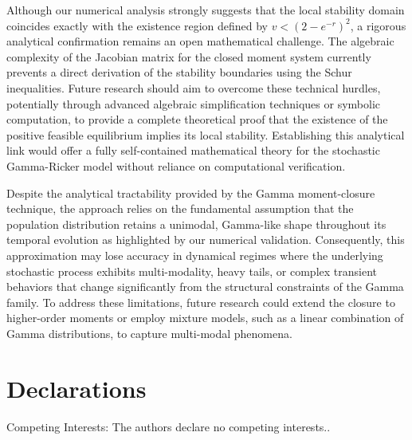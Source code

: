 \documentclass[12pt]{article}
\theoremstyle{definition}
\begin{document}
Although our numerical analysis strongly suggests that the local stability domain coincides exactly with the existence region defined by $v < (2-e^{-r})^2$, a rigorous analytical confirmation remains an open mathematical challenge. The algebraic complexity of the Jacobian matrix for the closed moment system currently prevents a direct derivation of the stability boundaries using the Schur inequalities. Future research should aim to overcome these technical hurdles, potentially through advanced algebraic simplification techniques or symbolic computation, to provide a complete theoretical proof that the existence of the positive feasible equilibrium implies its local stability. Establishing this analytical link would offer a fully self-contained mathematical theory for the stochastic Gamma-Ricker model without reliance on computational verification.


Despite the analytical tractability provided by the Gamma moment-closure technique, the approach relies on the fundamental assumption that the population distribution retains a unimodal, Gamma-like shape throughout its temporal evolution as highlighted by our numerical validation.  Consequently, this approximation may lose accuracy in dynamical regimes where the underlying stochastic process exhibits multi-modality, heavy tails, or complex transient behaviors that change significantly from the structural constraints of the Gamma family. To address these limitations, future research could extend the closure to higher-order moments or employ mixture models, such as a linear combination of Gamma distributions, to capture multi-modal phenomena. 



\section{Declarations}
Competing Interests: The authors declare no competing interests..
\end{document}
